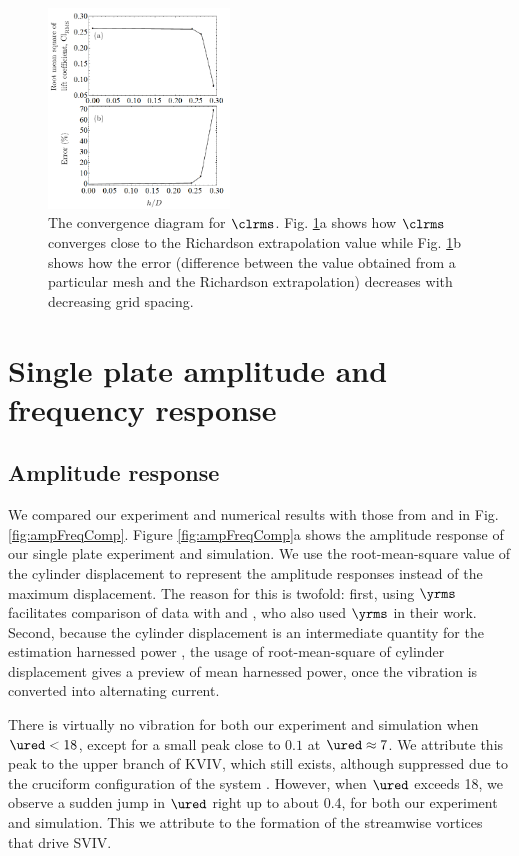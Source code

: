 \documentclass[a4paper,fleqn]{cas-sc}
\begin{document}
\begin{figure}
  \centering
  \includegraphics[width=0.43\textwidth]{figs/figure9}
  \caption{The convergence diagram for $\clrms$. Fig. \ref{fig:clrmsGCI}a shows how $\clrms$ converges close to the Richardson extrapolation value while Fig. \ref{fig:clrmsGCI}b shows how the error (difference between the value obtained from a particular mesh and the Richardson extrapolation) decreases with decreasing grid spacing.} \label{fig:clrmsGCI}
\end{figure}

\section{Single plate amplitude and frequency response} \label{sec:singPlateResp}
\subsection{Amplitude response} \label{ssec:ampResp}
We compared our experiment and numerical results with those from \citet{Koide2013} and \citet{Nguyen2012} in Fig. \ref{fig:ampFreqComp}. Figure \ref{fig:ampFreqComp}a shows the amplitude response of our single plate experiment and simulation. We use the root-mean-square value of the cylinder displacement to represent the amplitude responses instead of the maximum displacement. The reason for this is twofold: first, using  $\yrms$  facilitates comparison of data with \citet{Nguyen2012} and \citet{Koide2013}, who also used  $\yrms$  in their work. Second, because the cylinder displacement is an intermediate quantity for the estimation harnessed power \citep{Maruai2017,Maruai2018}, the usage of root-mean-square of cylinder displacement gives a preview of mean harnessed power, once the vibration is converted into alternating current.

There is virtually no vibration for both our experiment and simulation when  $\ured < 18$, except for a small peak close to $0.1$ at  $\ured \approx 7$. We attribute this peak to the upper branch of KVIV, which still exists, although suppressed due to the cruciform configuration of the system \citep{Shirakashi1989,Nguyen2012}. However, when  $\ured$ exceeds 18, we observe a sudden jump in  $\ured$ right up to about 0.4, for both our experiment and simulation. This we attribute to the formation of the streamwise vortices that drive SVIV.
\end{document}
